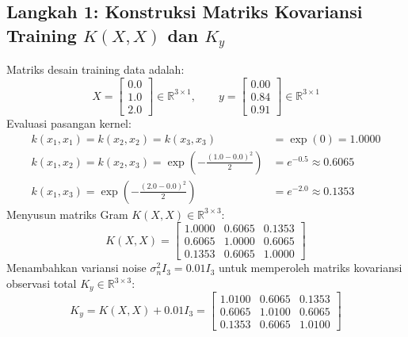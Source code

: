 \documentclass[11pt,a4paper]{article}
\def\mathbf#1{#1}%
\begin{document}
\subsection{Langkah 1: Konstruksi Matriks Kovariansi Training \texorpdfstring{$K(X, X)$ dan $K_y$}{K(X, X) dan Ky}}
Matriks desain training data adalah:
\begin{equation}
X = \begin{bmatrix} 0.0 \\ 1.0 \\ 2.0 \end{bmatrix} \in \mathbb{R}^{3 \times 1}, \qquad \mathbf{y} = \begin{bmatrix} 0.00 \\ 0.84 \\ 0.91 \end{bmatrix} \in \mathbb{R}^{3 \times 1}
\end{equation}
Evaluasi pasangan kernel:
\begin{align*}
k(x_1, x_1) = k(x_2, x_2) = k(x_3, x_3) &= \exp(0) = 1.0000 \\
k(x_1, x_2) = k(x_2, x_3) = \exp\left(-\frac{(1.0 - 0.0)^2}{2}\right) &= e^{-0.5} \approx 0.6065 \\
k(x_1, x_3) = \exp\left(-\frac{(2.0 - 0.0)^2}{2}\right) &= e^{-2.0} \approx 0.1353
\end{align*}
Menyusun matriks Gram $K(X, X) \in \mathbb{R}^{3 \times 3}$:
\begin{equation}
K(X, X) = \begin{bmatrix}
1.0000 & 0.6065 & 0.1353 \\
0.6065 & 1.0000 & 0.6065 \\
0.1353 & 0.6065 & 1.0000
\end{bmatrix}
\end{equation}
Menambahkan variansi noise $\sigma_n^2 I_3 = 0.01 I_3$ untuk memperoleh matriks kovariansi observasi total $K_y \in \mathbb{R}^{3 \times 3}$:
\begin{equation}
K_y = K(X, X) + 0.01 I_3 = \begin{bmatrix}
1.0100 & 0.6065 & 0.1353 \\
0.6065 & 1.0100 & 0.6065 \\
0.1353 & 0.6065 & 1.0100
\end{bmatrix}
\end{equation}
\end{document}
